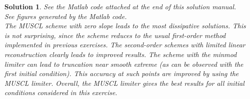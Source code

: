 \documentclass[10pt,letterpaper]{article}
\theoremstyle{break}
\newtheorem{solution}{Solution}
\begin{document}
\begin{solution}
	See the Matlab code attached at the end of this solution manual.
	\\

	See figures generated by the Matlab code.
	\\

	The MUSCL scheme with zero slope leads to the most dissipative solutions.
	This is not surprising, since the scheme reduces to the usual first-order method implemented in previous exercises.
	The second-order schemes with limited linear reconstruction clearly leads to improved results.
	The scheme with the minmod limiter can lead to truncation near smooth extreme (as can be observed with the first initial condition).
	This accuracy at such points are improved by using the MUSCL limiter.
	Overall, the MUSCL limiter gives the best results for all initial conditions considered in this exercise.
	
	
	
	
	
	
	
\end{solution}
	
\end{document}
